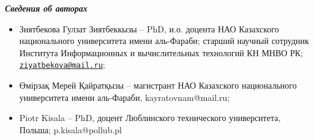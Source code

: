 \emph{{\bfseries Сведения об авторах}}


\begin{itemize}
\item
Зиятбекова Гулзат Зиятбеккызы -- PhD, и.о. доцента НАО Казахского
национального университета имени аль-Фараби; старший научный сотрудник
Института Информационных и вычислительных технологий КН МНВО РК;
\href{mailto:ziyatbekova@mail.ru}{\nolinkurl{ziyatbekova@mail.ru}};

\item
Өмірзақ Мерей Қайратқызы -- магистрант НАО Казахского национального
университета имени аль-Фараби, kayratovnam@mail.ru;

\item
Piotr Kisala -- PhD, доцент Люблинского технического университета,
Польша; p.kisala@pollub.pl
\end{itemize}
